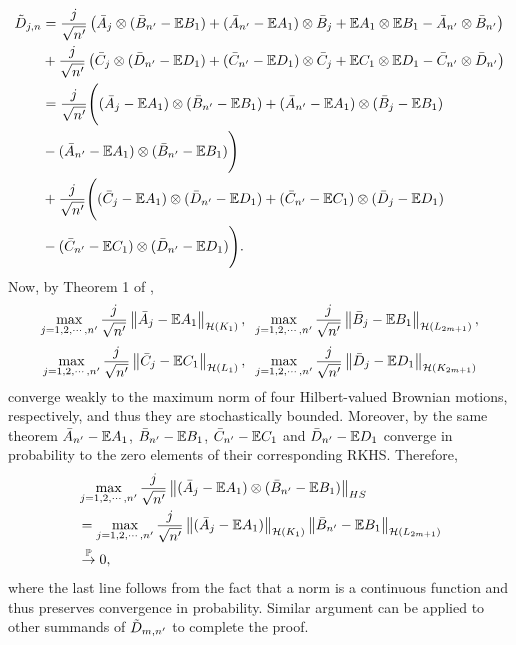 \documentclass[11pt]{article}
\newcommand{\bE}{\mathbb{E}}
\newcommand{\bP}{\mathbb{P}}
\theoremstyle{plain}
\theoremstyle{definition}
\theoremstyle{remark}
\begin{document}
\begin{appendix}
\begin{align*}
    \Tilde{D}_{j,n}&=\frac{j}{\sqrt{n'}}\left(\Bar{A}_j\otimes (\Bar{B}_{n'}-\bE B_1)+ (\Bar{A}_{n'}-\bE A_1)\otimes \Bar{B}_j+ \bE A_1 \otimes \bE B_1 -\Bar{A}_{n'}\otimes \Bar{B}_{n'}\right)\\
    &+\frac{j}{\sqrt{n'}}\left(\Bar{C}_j\otimes (\Bar{D}_{n'}-\bE D_1)+ (\Bar{C}_{n'}-\bE D_1)\otimes \Bar{C}_j+ \bE C_1 \otimes \bE D_1 -\Bar{C}_{n'}\otimes \Bar{D}_{n'}\right)\allowdisplaybreaks\\
    &=\frac{j}{\sqrt{n'}}\Bigg((\Bar{A}_j-\bE A_1)\otimes (\Bar{B}_{n'}-\bE B_1)+(\Bar{A}_{n'}-\bE A_1)\otimes (\Bar{B}_{j}-\bE B_1)\\
    &-(\Bar{A}_{n'}-\bE A_1)\otimes (\Bar{B}_{n'}-\bE B_1)\Bigg)\\
    &+\frac{j}{\sqrt{n'}}\Bigg((\Bar{C}_j-\bE A_1)\otimes (\Bar{D}_{n'}-\bE D_1)+(\Bar{C}_{n'}-\bE C_1)\otimes (\Bar{D}_{j}-\bE D_1)\\
    &-(\Bar{C}_{n'}-\bE C_1)\otimes (\Bar{D}_{n'}-\bE D_1)\Bigg).
\end{align*}
Now, by Theorem 1 of \cite{sharipov2016sequential}, 
$$\max_{j=1,2,\cdots,n'} \frac{j}{\sqrt{n'}}\left\|\Bar{A}_j-\bE A_1\right\|_{\mathcal{H}(K_1)},\;\;\max_{j=1,2,\cdots,n'} \frac{j}{\sqrt{n'}}\left\|\Bar{B}_j-\bE B_1\right\|_{\mathcal{H}(L_{2m+1})},$$
$$\max_{j=1,2,\cdots,n'} \frac{j}{\sqrt{n'}}\left\|\Bar{C}_j-\bE C_1\right\|_{\mathcal{H}(L_1)},\;\;\max_{j=1,2,\cdots,n'} \frac{j}{\sqrt{n'}}\left\|\Bar{D}_j-\bE D_1\right\|_{\mathcal{H}(K_{2m+1})}$$
converge weakly to the maximum norm of four Hilbert-valued Brownian motions, respectively, and thus they are stochastically bounded. Moreover, by the same theorem $\Bar{A}_{n'}-\bE A_1$, $\Bar{B}_{n'}-\bE B_1$, $\Bar{C}_{n'}-\bE C_1$ and $\Bar{D}_{n'}-\bE D_1$ converge in probability to the zero elements of their corresponding RKHS. Therefore,
\begin{align*}
    &\max_{j=1,2,\cdots,n'}\frac{j}{\sqrt{n'}}\left\|(\Bar{A}_j-\bE A_1)\otimes (\Bar{B}_{n'}-\bE B_1)\right\|_{HS}\\
    &=\max_{j=1,2,\cdots,n'}\frac{j}{\sqrt{n'}}\left\|(\Bar{A}_j-\bE A_1)\right\|_{\mathcal{H}(K_1)}\left\|\Bar{B}_{n'}-\bE B_1\right\|_{\mathcal{H}(L_{2m+1})}\\
    &\overset{\bP}{\to}0,
\end{align*}
where the last line follows from the fact that a norm is a continuous function and thus preserves convergence in probability. Similar argument can be applied to other summands of $\Tilde{D}_{m,n'}$ to complete the proof.

\end{appendix}
\end{document}
